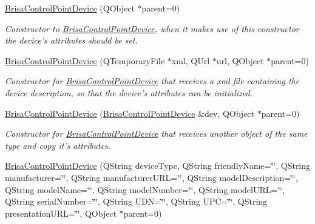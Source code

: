 \begin{DoxyCompactItemize}
\item 
\hyperlink{classBrisaUpnp_1_1BrisaControlPointDevice_a2e1bd5a83f24c10fee5dc544b8f810f7}{BrisaControlPointDevice} (QObject $\ast$parent=0)
\begin{DoxyCompactList}\small\item\em Constructor to \hyperlink{classBrisaUpnp_1_1BrisaControlPointDevice}{BrisaControlPointDevice}, when it makes use of this constructor the device's attributes should be set. \item\end{DoxyCompactList}\item 
\hyperlink{classBrisaUpnp_1_1BrisaControlPointDevice_a5001189cc91c6121878f8aeda7cfdeac}{BrisaControlPointDevice} (QTemporaryFile $\ast$xml, QUrl $\ast$url, QObject $\ast$parent=0)
\begin{DoxyCompactList}\small\item\em Constructor for \hyperlink{classBrisaUpnp_1_1BrisaControlPointDevice}{BrisaControlPointDevice} that receives a xml file containing the device description, so that the device's attributes can be initialized. \item\end{DoxyCompactList}\item 
\hyperlink{classBrisaUpnp_1_1BrisaControlPointDevice_ab5811ed1286b02af97d5d44033775c77}{BrisaControlPointDevice} (\hyperlink{classBrisaUpnp_1_1BrisaControlPointDevice}{BrisaControlPointDevice} \&dev, QObject $\ast$parent=0)
\begin{DoxyCompactList}\small\item\em Constructor for \hyperlink{classBrisaUpnp_1_1BrisaControlPointDevice}{BrisaControlPointDevice} that receives another object of the same type and copy it's attributes. \item\end{DoxyCompactList}\item 
\hyperlink{classBrisaUpnp_1_1BrisaControlPointDevice_ab1c22c8bcf8d041afb766d2773552cdd}{BrisaControlPointDevice} (QString deviceType, QString friendlyName=\char`\"{}\char`\"{}, QString manufacturer=\char`\"{}\char`\"{}, QString manufacturerURL=\char`\"{}\char`\"{}, QString modelDescription=\char`\"{}\char`\"{}, QString modelName=\char`\"{}\char`\"{}, QString modelNumber=\char`\"{}\char`\"{}, QString modelURL=\char`\"{}\char`\"{}, QString serialNumber=\char`\"{}\char`\"{}, QString UDN=\char`\"{}\char`\"{}, QString UPC=\char`\"{}\char`\"{}, QString presentationURL=\char`\"{}\char`\"{}, QObject $\ast$parent=0)

\end{DoxyCompactItemize}
